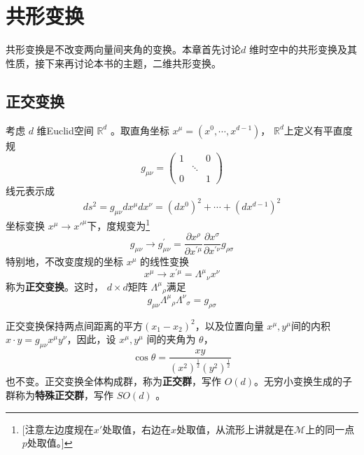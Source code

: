 \chapter{共形变换}

共形变换是不改变两向量间夹角的变换。本章首先讨论$ d$ 维时空中的共形变换及其性质，接下来再讨论本书的主题，二维共形变换。

\section{正交变换}
考虑 $d$ 维Euclid空间 $\mathbb{R}^d$ 。取直角坐标 $x^{\mu}=\left(x^{0}, \cdots, x^{d-1}\right) $， $\mathbb{R}^d $上定义有平直度规
\begin{equation}
	g_{\mu \nu}=\left(\begin{array}{ccc} 1 & & 0 \\ & \ddots & \\ 0 & & 1 \end{array}\right)
\end{equation}
线元表示成
\begin{equation}
	d s^{2}=g_{\mu \nu} d x^{\mu} d x^{\nu}=\left(d x^{0}\right)^{2}+\cdots+\left(d x^{d-1}\right)^{2}
\end{equation}
坐标变换 $x^\mu \to x'^\mu $下，度规变为\footnote{[注意左边度规在$x'$处取值，右边在$x$处取值，从流形上讲就是在$\mathcal{M}$上的同一点$p$处取值。]}
\begin{equation}
		g_{\mu \nu} \rightarrow g_{\mu \nu}^{\prime}=\frac{\partial x^{\rho}}{\partial x^{\prime \mu}} \frac{\partial x^{\sigma}}{\partial x^{\prime \nu}} g_{\rho \sigma}
\end{equation}
特别地，不改变度规的坐标 $x^\mu$ 的线性变换
\begin{equation}
	x^{\mu} \rightarrow x^{\prime \mu}=\Lambda^{\mu} {}_{\nu}x^{\nu}
\end{equation}
称为\textbf{正交变换}。这时， $d\times d $矩阵 $\Lambda^\mu{}_\rho $满足
\begin{equation}
	g_{\mu\nu}\Lambda^\mu{}_\rho \Lambda^\nu{}_\sigma=g_{\rho\sigma}
\end{equation}

正交变换保持两点间距离的平方$ (x_1-x_2)^2$，以及位置向量 $x^\mu,y^\mu $间的内积 $x\cdot y=g_{\mu \nu} x^{\mu} y^{\nu} $，因此，设 $x^\mu,y^\mu$ 间的夹角为 $\theta $，
\begin{equation}
	\cos \theta=\frac{x y}{\left(x^{2}\right)^{\frac{1}{2}}\left(y^{2}\right)^{\frac{1}{2}}}
\end{equation}
也不变。正交变换全体构成群，称为\textbf{正交群}，写作 $O(d) $。无穷小变换生成的子群称为\textbf{特殊正交群}，写作 $SO(d)$ 。

